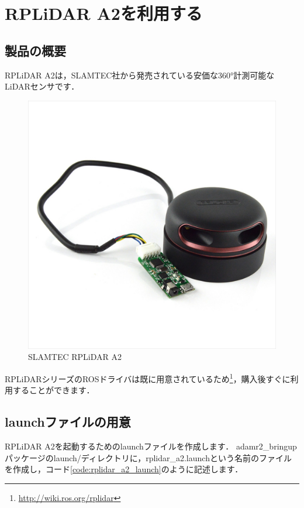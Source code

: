 \documentclass[{../../master}]{subfiles}
\begin{document}
\section{RPLiDAR A2を利用する}

\subsection{製品の概要}

RPLiDAR A2は，SLAMTEC社から発売されている安価な360°計測可能なLiDARセンサです．

\begin{figure}[ht]
  \centering
  \includegraphics[height=50truemm]{images/rplidar_a2.jpg}
  \caption{SLAMTEC RPLiDAR A2}
\end{figure}

RPLiDARシリーズのROSドライバは既に用意されているため\footnote{\url{http://wiki.ros.org/rplidar}}，購入後すぐに利用することができます．

\subsection{launchファイルの用意}

RPLiDAR A2を起動するためのlaunchファイルを作成します．
\textsf{adamr2\_bringup}パッケージの\textsf{launch/}ディレクトリに，\textsf{rplidar\_a2.launch}という名前のファイルを作成し，コード\ref{code:rplidar_a2_launch}のように記述します．
\end{document}
